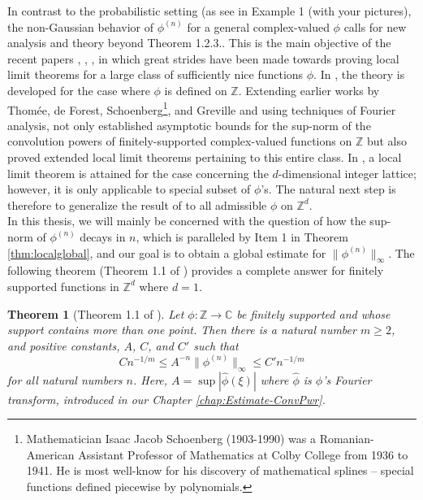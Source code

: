 \documentclass[11pt, letter]{book}
\newtheorem{theorem}{Theorem}[section]
\begin{document}
\noindent In contrast to the probabilistic setting (as see in Example 1 (with your pictures), the non-Gaussian behavior of $\phi^{(n)}$ for a general complex-valued $\phi$ calls for new analysis and theory beyond Theorem 1.2.3.. This is the main objective of the recent papers \cite{randles_convolution_2015}, \cite{randles_convolution_2017}, \cite{diaconis_convolution_2014}, in which great strides have been made towards proving local limit theorems for a large class of sufficiently nice functions $\phi$. In \cite{randles_convolution_2015}, the theory is developed for the case where $\phi$ is defined on $\mathbb{Z}$. Extending earlier works by Thom\'{e}e, de Forest, Schoenberg\footnote{Mathematician Isaac Jacob Schoenberg (1903-1990) was a Romanian-American Assistant Professor of Mathematics at Colby College from 1936 to 1941. He is most well-know for his discovery of mathematical splines --  special functions defined piecewise by polynomials.}, and Greville and using techniques of Fourier analysis, \cite{randles_convolution_2015} not only established asymptotic bounds for the sup-norm of the convolution powers of finitely-supported complex-valued functions on $\mathbb{Z}$ but also proved extended local limit theorems pertaining to this entire class. In \cite{randles_convolution_2017}, a local limit theorem is attained for the case concerning the $d$-dimensional integer lattice; however, it is only applicable to special subset of $\phi$'s. The natural next step is therefore to generalize the result of \cite{randles_convolution_2017} to all admissible $\phi$ on $\mathbb{Z}^d$.\\



\noindent In this thesis, we will mainly be concerned with the question of how the sup-norm of $\phi^{(n)}$ decays in $n$, which is paralleled by Item 1 in Theorem \ref{thm:localglobal}, and our goal is to obtain a global estimate for $\|\phi^{(n)}\|_\infty$. The following theorem (Theorem 1.1 of \cite{randles_convolution_2015}) provides a complete answer for finitely supported functions in $\mathbb{Z}^d$ where $d=1$. 


\begin{framed}
\begin{theorem}[Theorem 1.1 of \cite{randles_convolution_2015}]
Let $\phi : \mathbb{Z} \to \mathbb{C}$ be finitely supported and whose support contains more than one point. Then there is a natural number $m \geq 2$, and positive constants, $A$, $C$, and $C'$ such that 
\begin{equation*}
    Cn^{-1/m} \leq A^{-n}\| \phi^{(n)} \|_\infty \leq C' n^{-1/m}
\end{equation*}
for all natural numbers $n$. Here, $A=\sup|\widehat{\phi}(\xi)|$ where $\widehat{\phi}$ is $\phi$'s Fourier transform, introduced in our Chapter \ref{chap:Estimate-ConvPwr}.
\end{theorem}
\end{framed}
\end{document}
